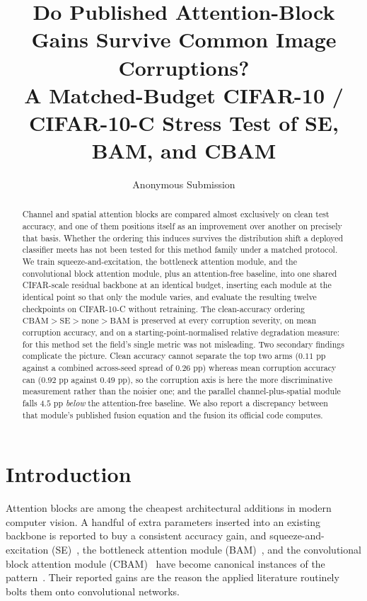 \documentclass[10pt]{article}
\begin{document}
\title{Do Published Attention-Block Gains Survive Common Image Corruptions?\\
A Matched-Budget CIFAR-10 / CIFAR-10-C Stress Test of SE, BAM, and CBAM}
\author{Anonymous Submission}
\date{}
\maketitle

\begin{abstract}
Channel and spatial attention blocks are compared almost exclusively on clean
test accuracy, and one of them positions itself as an improvement over another
on precisely that basis. Whether the ordering this induces survives the
distribution shift a deployed classifier meets has not been tested for this
method family under a matched protocol. We train squeeze-and-excitation, the
bottleneck attention module, and the convolutional block attention module, plus
an attention-free baseline, into one shared CIFAR-scale residual backbone at an
identical budget, inserting each module at the identical point so that only the
module varies, and evaluate the resulting twelve checkpoints on CIFAR-10-C
without retraining. The clean-accuracy ordering
$\text{CBAM} > \text{SE} > \text{none} > \text{BAM}$ is preserved at every
corruption severity, on mean corruption accuracy, and on a
starting-point-normalised relative degradation measure: for this method set the
field's single metric was not misleading. Two secondary findings complicate the
picture. Clean accuracy cannot separate the top two arms ($0.11$ pp against a
combined across-seed spread of $0.26$ pp) whereas mean corruption accuracy can
($0.92$ pp against $0.49$ pp), so the corruption axis is here the more
discriminative measurement rather than the noisier one; and the parallel
channel-plus-spatial module falls $4.5$ pp \emph{below} the attention-free
baseline. We also report a discrepancy between that module's published fusion
equation and the fusion its official code computes.
\end{abstract}

\section{Introduction}
\label{sec:introduction}

Attention blocks are among the cheapest architectural additions in modern
computer vision. A handful of extra parameters inserted into an existing
backbone is reported to buy a consistent accuracy gain, and
squeeze-and-excitation (SE)~\citep{hu2018squeeze}, the bottleneck attention
module (BAM)~\citep{park2018bam}, and the convolutional block attention module
(CBAM)~\citep{woo2018cbam} have become canonical instances of the
pattern~\citep{guo2022attention}. Their reported gains are the reason the
applied literature routinely bolts them onto convolutional networks.
\end{document}
